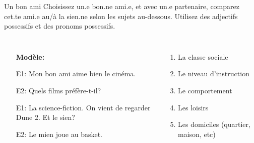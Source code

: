 \begin{frame}{Un bon ami}
  Choisissez un.e bon.ne ami.e, et avec un.e partenaire, comparez cet.te ami.e au/à la sien.ne selon les sujets au-dessous.
  Utilisez des adjectifs possessifs et des pronoms possessifs.
  \begin{columns}
      \begin{itemize}
        \item[] \textbf{Modèle:}
        \item[E1:] Mon bon ami aime bien le cinéma.
        \item[E2:] Quels films préfère-t-il?
        \item[E1:] La science-fiction. On vient de regarder Dune 2. Et le sien?
        \item[E2:] Le mien joue au basket.
      \end{itemize}
      \begin{enumerate}
        \item La classe sociale
        \item Le niveau d'instruction
        \item Le comportement
        \item Les loisirs
        \item Les domiciles (quartier, maison, etc)
      \end{enumerate}
  \end{columns}
\end{frame}
